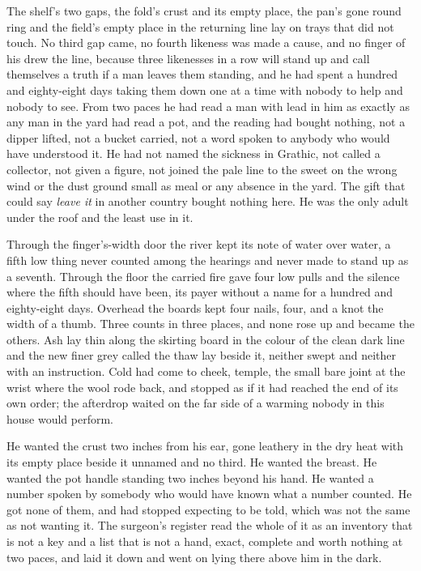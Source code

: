 The shelf's two gaps, the fold's crust and its empty place, the pan's gone round ring and the field's empty place in the returning line lay on trays that did not touch. No third gap came, no fourth likeness was made a cause, and no finger of his drew the line, because three likenesses in a row will stand up and call themselves a truth if a man leaves them standing, and he had spent a hundred and eighty-eight days taking them down one at a time with nobody to help and nobody to see. From two paces he had read a man with lead in him as exactly as any man in the yard had read a pot, and the reading had bought nothing, not a dipper lifted, not a bucket carried, not a word spoken to anybody who would have understood it. He had not named the sickness in Grathic, not called a collector, not given a figure, not joined the pale line to the sweet on the wrong wind or the dust ground small as meal or any absence in the yard. The gift that could say \emph{leave it} in another country bought nothing here. He was the only adult under the roof and the least use in it.

\scenebreak

Through the finger's-width door the river kept its note of water over water, a fifth low thing never counted among the hearings and never made to stand up as a seventh. Through the floor the carried fire gave four low pulls and the silence where the fifth should have been, its payer without a name for a hundred and eighty-eight days. Overhead the boards kept four nails, four, and a knot the width of a thumb. Three counts in three places, and none rose up and became the others. Ash lay thin along the skirting board in the colour of the clean dark line and the new finer grey called the thaw lay beside it, neither swept and neither with an instruction. Cold had come to cheek, temple, the small bare joint at the wrist where the wool rode back, and stopped as if it had reached the end of its own order; the afterdrop waited on the far side of a warming nobody in this house would perform.

He wanted the crust two inches from his ear, gone leathery in the dry heat with its empty place beside it unnamed and no third. He wanted the breast. He wanted the pot handle standing two inches beyond his hand. He wanted a number spoken by somebody who would have known what a number counted. He got none of them, and had stopped expecting to be told, which was not the same as not wanting it. The surgeon's register read the whole of it as an inventory that is not a key and a list that is not a hand, exact, complete and worth nothing at two paces, and laid it down and went on lying there above him in the dark.

